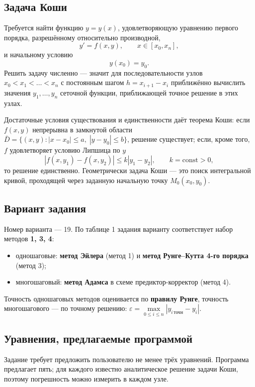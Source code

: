 \documentclass[12pt,a4paper]{article}
\begin{document}
\subsection{Задача Коши}
Требуется найти функцию $y=y(x)$, удовлетворяющую уравнению первого порядка,
разрешённому относительно производной,
\[
y' = f(x,y),\qquad x\in[x_0,x_n],
\]
и начальному условию
\[
y(x_0)=y_0 .
\]
Решить задачу численно --- значит для последовательности узлов
$x_0<x_1<\dots<x_n$ с постоянным шагом $h=x_{i+1}-x_i$ приближённо вычислить
значения $y_1,\dots,y_n$ сеточной функции, приближающей точное решение
в этих узлах.

Достаточные условия существования и единственности даёт теорема Коши: если
$f(x,y)$ непрерывна в замкнутой области
$\bar D=\{(x,y):|x-x_0|\le a,\;|y-y_0|\le b\}$, решение существует; если,
кроме того, $f$ удовлетворяет условию Липшица по $y$
\[
|f(x,y_1)-f(x,y_2)|\le k|y_1-y_2|,\qquad k=\mathrm{const}>0,
\]
то решение единственно. Геометрически задача Коши --- это поиск интегральной
кривой, проходящей через заданную начальную точку $M_0(x_0,y_0)$.

\subsection{Вариант задания}
Номер варианта --- 19. По таблице 1 задания варианту соответствует набор
методов \textbf{1, 3, 4}:
\begin{itemize}[leftmargin=*]
\item одношаговые: \textbf{метод Эйлера} (метод 1) и
      \textbf{метод Рунге--Кутта 4-го порядка} (метод 3);
\item многошаговый: \textbf{метод Адамса} в схеме предиктор-корректор (метод 4).
\end{itemize}
Точность одношаговых методов оценивается по \textbf{правилу Рунге}, точность
многошагового --- по точному решению: $\varepsilon=\max\limits_{0\le i\le n}
|y_{i\,\text{точн}}-y_i|$.

\subsection{Уравнения, предлагаемые программой}
Задание требует предложить пользователю не менее трёх уравнений. Программа
предлагает пять; для каждого известно аналитическое решение задачи Коши,
поэтому погрешность можно измерить в каждом узле.
\end{document}
